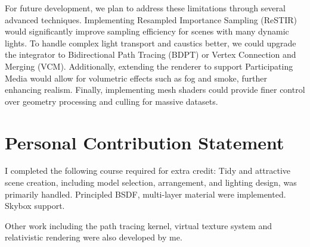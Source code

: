 \documentclass[sigconf]{acmart}
\begin{document}
For future development, we plan to address these limitations through several advanced techniques. Implementing Resampled Importance Sampling (ReSTIR) would significantly improve sampling efficiency for scenes with many dynamic lights. To handle complex light transport and caustics better, we could upgrade the integrator to Bidirectional Path Tracing (BDPT) or Vertex Connection and Merging (VCM). Additionally, extending the renderer to support Participating Media would allow for volumetric effects such as fog and smoke, further enhancing realism. Finally, implementing mesh shaders could provide finer control over geometry processing and culling for massive datasets.

\section{Personal Contribution Statement}
I completed the following course required for extra credit: Tidy and attractive scene creation, including model selection, arrangement, and lighting design, was primarily handled. Principled BSDF, multi-layer material were implemented. Skybox support.

Other work including the path tracing kernel, virtual texture system and relativistic rendering were also developed by me.



\end{document}
